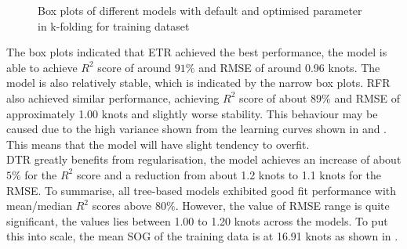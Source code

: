 \begin{figure}[ht]
    \centering
    \caption{Box plots of different models with default and optimised parameter in k-folding for training dataset}
    \label{fig:train_boxplot_r2_rmse}
\end{figure}

The box plots indicated that ETR achieved the best performance, the model is able to achieve $R^2$ score of around $91\%$ and RMSE of around 0.96 knots. The model is also relatively stable, which is indicated by the narrow box plots. RFR also achieved similar performance, achieving $R^2$ score of about $89\%$ and RMSE of approximately 1.00 knots and slightly worse stability. This behaviour may be caused due to the high variance shown from the learning curves shown in  and . This means that the model will have slight tendency to overfit.\\

DTR greatly benefits from regularisation, the model achieves an increase of about $5\%$ for the $R^2$ score and a reduction from about 1.2 knots to 1.1 knots for the RMSE. To summarise, all tree-based models exhibited good fit performance with mean/median $R^2$ scores above $80\%$. However, the value of RMSE range is quite significant, the values lies between 1.00 to 1.20 knots across the models. To put this into scale, the mean SOG of the training data is at 16.91 knots as shown in .\\  

